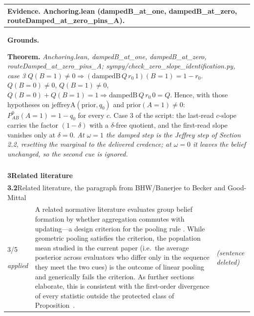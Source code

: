 \documentclass[10pt]{article}
\theoremstyle{definition}
\renewcommand{\ref}[1]{\textsc{\detokenize{#1}}}
\newlength{\fullw}\setlength{\fullw}{25.9cm}
\newcommand{\entryhead}[2]{\multicolumn{3}{|l|}{\rule{0pt}{2.6ex}\large\textbf{#1}\quad #2} \\ \hline}
\begin{document}
{\begin{longtable}{|p{0.9cm}|p{12.2cm}|p{12.2cm}|}
\multicolumn{3}{|p{\fullw}|}{\textbf{Evidence.} Anchoring.lean (dampedB\_at\_one, dampedB\_at\_zero, routeDamped\_at\_zero\_pins\_A).} \\ \hline
\multicolumn{3}{|p{\fullw}|}{\textbf{Grounds.}\par \textbf{Theorem.} \textit{Anchoring.lean, dampedB\_at\_one, dampedB\_at\_zero, routeDamped\_at\_zero\_pins\_A; sympy/check\_zero\_slope\_identification.py, case 3} \newline $Q(B{=}1)\neq0\Rightarrow(\mathrm{dampedB}\,Q\,r_0\,1)(B{=}1)=1-r_0$.
$Q(B{=}0)\neq0$, $Q(B{=}1)\neq0$, $Q(B{=}0)+Q(B{=}1)=1\Rightarrow\mathrm{dampedB}\,Q\,r_0\,0=Q$.
Hence, with those hypotheses on $\mathrm{jeffreyA}(\mathrm{prior},q_0)$ and
$\mathrm{prior}(A{=}1)\neq0$: $P^{0}_{AB}(A{=}1)=1-q_0$ for every $c$. Case 3 of the
script: the last-read $c$-slope carries the factor $(1-\delta)$ with a $\delta$-free
quotient, and the first-read slope vanishes only at $\delta=0$. \newline \textit{At $\omega=1$ the damped step is the Jeffrey step of Section 2.2, resetting the marginal to the delivered credence; at $\omega=0$ it leaves the belief unchanged, so the second cue is ignored.}} \\ \hline
\multicolumn{3}{|l|}{} \\ \hline
\multicolumn{3}{|l|}{\rule{0pt}{3.2ex}\Large\textbf{3\quad Related literature}} \\ \hline\hline
\entryhead{3.2}{Related literature, the paragraph from BHW/Banerjee to Becker and Good-Mittal\quad{\footnotesize\textit{(formerly C.11)}}}
3/5 \par{\tiny\textit{applied}} & A related normative literature evaluates group belief formation by whether aggregation commutes with updating---a design criterion for the pooling rule \citep{Dietrich2021}. While geometric pooling \citep[Def.~1]{Dietrich2021} satisfies the criterion, the population mean studied in the current paper (i.e.\ the average posterior across evaluators who differ only in the sequence they meet the two cues) is the outcome of linear pooling and generically fails the criterion. As further sections elaborate, this is consistent with the first-order divergence of every statistic outside the protected class of Proposition~\ref{prop:PRO}. & \textit{(sentence deleted)} \\ \hline

\end{longtable}}
\end{document}
